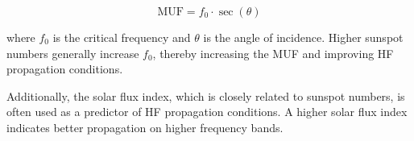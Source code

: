 \[
\text{MUF} = f_0 \cdot \sec(\theta)
\]

where \( f_0 \) is the critical frequency and \( \theta \) is the angle of incidence. Higher sunspot numbers generally increase \( f_0 \), thereby increasing the MUF and improving HF propagation conditions.

Additionally, the solar flux index, which is closely related to sunspot numbers, is often used as a predictor of HF propagation conditions. A higher solar flux index indicates better propagation on higher frequency bands.

